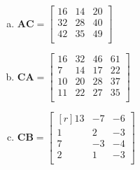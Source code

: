 \documentclass[letterpaper,fleqn]{article}
\begin{document}
\begin{enumerate}
\begin{enumerate}
\begin{enumerate}[(a)]
				\item $\textbf{AC}=\begin{bmatrix*}
					16 & 14 & 20 \\
					32 & 28 & 40 \\
					42 & 35 & 49 \\
				\end{bmatrix*}$
				
				\item $\textbf{CA}=\begin{bmatrix*}
					16 & 32 & 46 & 61 \\
					7 & 14 & 17 & 22 \\
					10 & 20 & 28 & 37 \\
					11 & 22 & 27 & 35 \\
				\end{bmatrix*}$
				
				\item $\textbf{CB}=\begin{bmatrix*}[r]
					13 & -7 & -6 \\
					1 & 2 & -3 \\
					7 & -3 & -4 \\
					2 & 1 & -3 \\
				\end{bmatrix*}$
			\end{enumerate}
			
			
			

\end{enumerate}
\end{enumerate}
\end{document}
